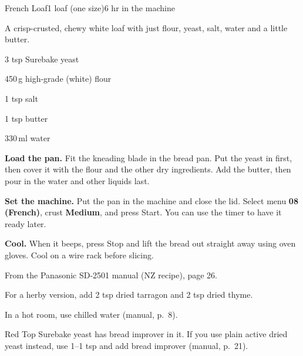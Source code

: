 \begin{recipebox}{French Loaf}{1 loaf (one size)}{6 hr in the machine}

A crisp-crusted, chewy white loaf with just flour, yeast, salt, water and a little butter.

\begin{ingredients}
  \item 3 tsp Surebake yeast
  \item 450\,g high-grade (white) flour
  \item 1 tsp salt
  \item 1 tsp butter
  \item 330\,ml water
\end{ingredients}

\begin{method}
  \item \textbf{Load the pan.} Fit the kneading blade in the bread pan. Put the yeast in first, then cover it with the flour and the other dry ingredients. Add the butter, then pour in the water and other liquids last.
  \item \textbf{Set the machine.} Put the pan in the machine and close the lid. Select menu \textbf{08 (French)}, crust \textbf{Medium}, and press Start. You can use the timer to have it ready later.
  \item \textbf{Cool.} When it beeps, press Stop and lift the bread out straight away using oven gloves. Cool on a wire rack before slicing.
\end{method}

\begin{notelist}
  \item From the Panasonic SD-2501 manual (NZ recipe), page 26.
  \item For a herby version, add 2 tsp dried tarragon and 2 tsp dried thyme.
  \item In a hot room, use chilled water (manual, p.~8).
  \item Red Top Surebake yeast has bread improver in it. If you use plain active dried yeast instead, use 1--1 tsp and add bread improver (manual, p.~21).
\end{notelist}

\end{recipebox}
